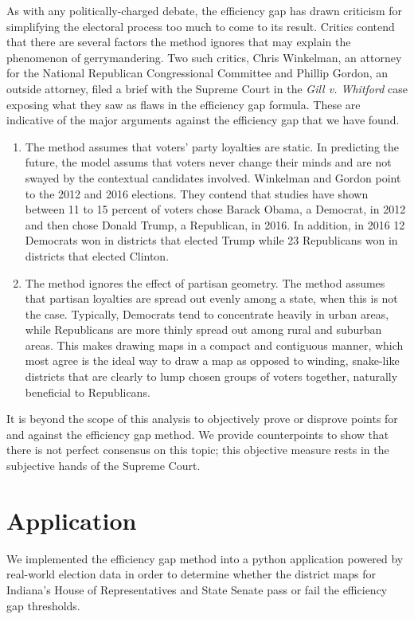 \documentclass[sigconf]{acmart}
\begin{document}
As with any politically-charged debate, the efficiency gap has drawn criticism for simplifying the electoral process too much to come to its result. Critics contend that there are several factors the method ignores that may explain the phenomenon of gerrymandering. Two such critics, Chris Winkelman, an attorney for the National Republican Congressional Committee and Phillip Gordon, an outside attorney, filed a brief with the Supreme Court in the \textit{Gill v. Whitford} case exposing what they saw as flaws in the efficiency gap formula.\cite{winkelman} These are indicative of the major arguments against the efficiency gap that we have found.
\begin{enumerate}
    \item The method assumes that voters' party loyalties are static. In predicting the future, the model assums that voters never change their minds and are not swayed by the contextual candidates involved. Winkelman and Gordon point to the 2012 and 2016 elections. They contend that studies have shown between 11 to 15 percent of voters chose Barack Obama, a Democrat, in 2012 and then chose Donald Trump, a Republican, in 2016. In addition, in 2016 12 Democrats won in districts that elected Trump while 23 Republicans won in districts that elected Clinton.
    \item The method ignores the effect of partisan geometry. The method assumes that partisan loyalties are spread out evenly among a state, when this is not the case. Typically, Democrats tend to concentrate heavily in urban areas, while Republicans are more thinly spread out among rural and suburban areas. This makes drawing maps in a compact and contiguous manner, which most agree is the ideal way to draw a map as opposed to winding, snake-like districts that are clearly to lump chosen groups of voters together, naturally beneficial to Republicans.
\end{enumerate}
It is beyond the scope of this analysis to objectively prove or disprove points for and against the efficiency gap method. We provide counterpoints to show that there is not perfect consensus on this topic; this objective measure rests in the subjective hands of the Supreme Court.

\section{Application}

We implemented the efficiency gap method into a python application powered by real-world election data in order to determine whether the district maps for Indiana's House of Representatives and State Senate pass or fail the efficiency gap thresholds. 
\end{document}
